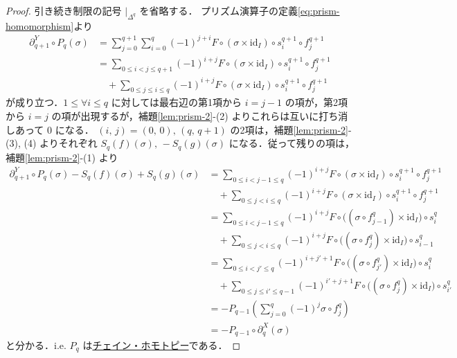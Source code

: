 \documentclass[algtopo_main]{subfiles}
\begin{document}
\begin{proof}
    引き続き制限の記号 $|_{\Delta^q}$ を省略する．
    プリズム演算子の定義\eqref{eq:prism-homomorphism}より
    \begin{align}
        \partial^{Y}_{q+1} \circ P_q(\sigma) &= \sum_{j=0}^{q+1}\sum_{i=0}^q (-1)^{j+i} F\circ (\sigma \times \mathrm{id}_I) \circ s_i^{q+1} \circ f_j^{q+1} \\
        &= \sum_{0 \le i < j \le q+1} (-1)^{i+j} F \circ (\sigma \times \mathrm{id}_I) \circ s_i^{q+1} \circ f_j^{q+1} \\
        &\quad + \sum_{0 \le j \le i \le q} (-1)^{i+j} F \circ (\sigma \times \mathrm{id}_I) \circ s_i^{q+1} \circ f_j^{q+1}
    \end{align}
    が成り立つ．$1 \le \forall i \le q$ に対しては最右辺の第1項から $i=j-1$ の項が，第2項から $i=j$ の項が出現するが，補題\ref{lem:prism-2}-(2) よりこれらは互いに打ち消しあって $0$ になる．
    $(i,\, j) = (0,\, 0),\, (q,\, q+1)$ の2項は，補題\ref{lem:prism-2}-(3), (4) よりそれぞれ
    $S_q(f)(\sigma),\, -S_q(g)(\sigma)$ になる．従って残りの項は，補題\ref{lem:prism-2}-(1) より
    \begin{align}
        \partial^{Y}_{q+1} \circ P_q(\sigma) - S_q(f)(\sigma) + S_q(g)(\sigma) &= \sum_{0\le i < j-1 \le q} (-1)^{i+j} F \circ (\sigma \times \mathrm{id}_I) \circ s_i^{q+1} \circ f_j^{q+1} \\
        &\quad + \sum_{0\le j < i \le q} (-1)^{i+j} F \circ (\sigma \times \mathrm{id}_I) \circ s_i^{q+1} \circ f_j^{q+1} \\
        &= \sum_{0\le i < j-1 \le q} (-1)^{i+j} F \circ \bigl((\sigma \circ f_{j-1}^q) \times \mathrm{id}_I\bigr) \circ s_i^q \\
        &\quad + \sum_{0\le j < i \le q} (-1)^{i+j} F \circ \bigl((\sigma \circ f_j^q)\times \mathrm{id}_I\bigr) \circ s_{i-1}^q \\
        &= \sum_{0\le i < j' \le q} (-1)^{i+j'+1} F \circ \bigl((\sigma \circ f_{j'}^q) \times \mathrm{id}_I\bigr) \circ s_i^q \\
        &\quad + \sum_{0\le j \le i' \le q-1} (-1)^{i'+j+1} F \circ \bigl((\sigma \circ f_j^q)\times \mathrm{id}_I\bigr) \circ s_{i'}^q \\
        &= -P_{q-1} \left( \sum_{j=0}^{q} (-1)^j\sigma \circ f_j^q \right) \\
        &= -P_{q-1} \circ \partial^X_q (\sigma)
    \end{align}
    と分かる．i.e. $P_q$ は\hyperref[def:chainHomotopy]{チェイン・ホモトピー}である．

\end{proof}
\end{document}
